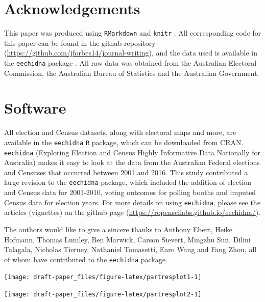 \documentclass[11pt,a4paper,]{article}
\let\origfigure\figure
\let\endorigfigure\endfigure
\renewenvironment{figure}[1][2] {
    \expandafter\origfigure\expandafter[H]
} {
    \endorigfigure
}
\begin{document}
\hypertarget{acknowledgements}{%
\section{Acknowledgements}\label{acknowledgements}}

This paper was produced using \texttt{RMarkdown} \autocite{rmarkdown} and \texttt{knitr} \autocite{knitr}. All corresponding code for this paper can be found in the github repository (\url{https://github.com/jforbes14/journal-writing}), and the data used is available in the \texttt{eechidna} package \autocite{eechidna}. All raw data was obtained from the Australian Electoral Commission, the Australian Bureau of Statistics and the Australian Government.

\hypertarget{software}{%
\section{Software}\label{software}}

All election and Census datasets, along with electoral maps and more, are available in the \texttt{eechidna} \texttt{R} package, which can be downloaded from CRAN. \texttt{eechidna} (Exploring Election and Census Highly Informative Data Nationally for Australia) makes it easy to look at the data from the Australian Federal elections and Censuses that occurred between 2001 and 2016. This study contributed a large revision to the \texttt{eechidna} package, which included the addition of election and Census data for 2001-2010, voting outcomes for polling booths and imputed Census data for election years. For more details on using \texttt{eechidna}, please see the articles (vignettes) on the github page (\url{https://ropenscilabs.github.io/eechidna/}).

The authors would like to give a sincere thanks to Anthony Ebert, Heike Hofmann, Thomas Lumley, Ben Marwick, Carson Sievert, Mingzhu Sun, Dilini Talagala, Nicholas Tierney, Nathaniel Tomasetti, Earo Wang and Fang Zhou, all of whom have contributed to the \texttt{eechidna} package.

\begin{figure}[h]

{\centering \texttt{[image: draft-paper\_files/figure-latex/partresplot1-1]} 

}

\caption{Partial residual plots for: Incomes, Unemployment, Extractive, Transformative, ManagerAdmin and DiffAddress}\label{fig:partresplot1}
\end{figure}

\begin{figure}[h]

{\centering \texttt{[image: draft-paper\_files/figure-latex/partresplot2-1]} 

}

\caption{Partial residual plots for: DeFacto, MedianAge, Education, OtherLanguage, BornSEEuro, BornAsia and Judaism.}\label{fig:partresplot2}
\end{figure}

\printbibliography
\end{document}

